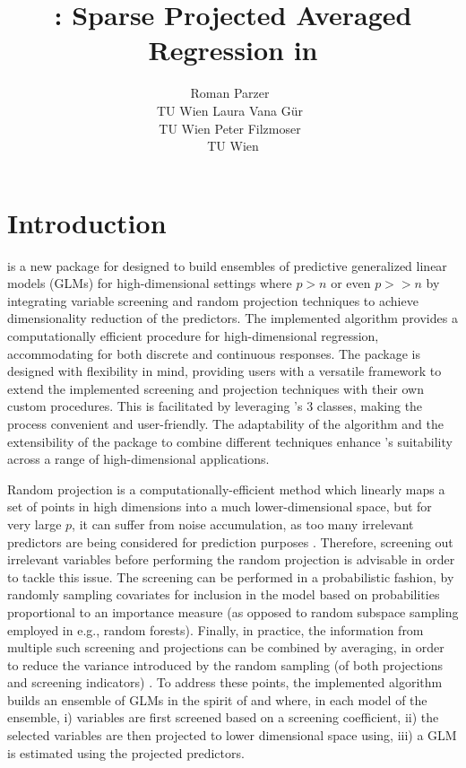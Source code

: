 \documentclass[
  article]{jss}
\author{Roman Parzer~\orcidlink{0000-0003-0893-3190}\\TU Wien \And Laura
Vana Gür~\orcidlink{0000-0002-9613-7604}\\TU Wien \AND Peter
Filzmoser~\orcidlink{0000-0002-8014-4682}\\TU Wien}
\title{\pkg{SPAR}: Sparse Projected Averaged Regression in \proglang{R}}
\begin{document}
\maketitle


\section{Introduction}\label{sec-intro}

 is a new package for  \citep{RLanguage} designed
to build ensembles of predictive generalized linear models (GLMs) for
high-dimensional settings where \(p>n\) or even \(p>>n\) by integrating
variable screening and random projection techniques to achieve
dimensionality reduction of the predictors. The implemented algorithm
provides a computationally efficient procedure for high-dimensional
regression, accommodating for both discrete and continuous responses.
The package is designed with flexibility in mind, providing users with a
versatile framework to extend the implemented screening and projection
techniques with their own custom procedures. This is facilitated by
leveraging 's 3 classes, making the process
convenient and user-friendly. The adaptability of the algorithm and the
extensibility of the package to combine different techniques enhance
's suitability across a range of high-dimensional
applications.

Random projection is a computationally-efficient method which linearly
maps a set of points in high dimensions into a much lower-dimensional
space, but for very large \(p\), it can suffer from noise accumulation,
as too many irrelevant predictors are being considered for prediction
purposes \citep{Dunson2020TargRandProj}. Therefore, screening out
irrelevant variables before performing the random projection is
advisable in order to tackle this issue. The screening can be performed
in a probabilistic fashion, by randomly sampling covariates for
inclusion in the model based on probabilities proportional to an
importance measure (as opposed to random subspace sampling employed in
e.g., random forests). Finally, in practice, the information from
multiple such screening and projections can be combined by averaging, in
order to reduce the variance introduced by the random sampling (of both
projections and screening indicators) \citep{Thanei2017RPforHDR}. To
address these points, the implemented algorithm builds an ensemble of
GLMs in the spirit of \citet{Dunson2020TargRandProj} and
\citet{parzer2024glms} where, in each model of the ensemble, i)
variables are first screened based on a screening coefficient, ii) the
selected variables are then projected to lower dimensional space using,
iii) a GLM is estimated using the projected predictors.
\end{document}
